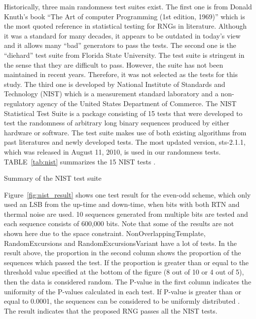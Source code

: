 Historically, three main randomness test suites exist. The first one is from Donald Knuth’s book “The Art of computer Programming (1st edition, 1969)” \cite{knuth1973art} which is the most quoted reference in statistical testing for RNGs in literature. Although it was a standard for many decades, it appears to be outdated in today’s view and it allows many “bad” generators to pass the tests. The second one is the “diehard” test suite from Florida State University. The test suite is stringent in the sense that they are difficult to pass. However, the suite has not been maintained in recent years. Therefore, it was not selected as the tests for this study. The third one is developed by National Institute of Standards and Technology (NIST) which is a measurement standard laboratory and a non-regulatory agency of the United States Department of Commerce. The NIST Statistical Test Suite is a package consisting of 15 tests that were developed to test the randomness of arbitrary long binary sequences produced by either hardware or software. The test suite makes use of both existing algorithms from past literatures and newly developed tests. The most updated version, sts-2.1.1, which was released in August 11, 2010, is used in our randomness tests. TABLE~\ref{tab:nist} summarizes the 15 NIST tests \cite{rukhin2001statistical}.

\begin{table}
  \begin{center}
    
  \end{center}
\caption{Summary of the NIST test suite}
\vspace{-0.2in}
\label{tab:nist}
\end{table}

Figure~\ref{fig:nist_result} shows one test result for the even-odd scheme, which only used an LSB from the up-time and down-time, when bits with both RTN and thermal noise are used. 10 sequences generated from multiple bits are tested and each sequence consists of 600,000 bits. Note that some of the results are not shown here due to the space constraint.  NonOverlappingTemplate, RandomExcursions and RandomExcursionsVariant have a lot of tests. In the result above, the proportion in the second column shows the proportion of the sequences which passed the test. If the proportion is greater than or equal to the threshold value specified at the bottom of the figure (8 out of 10 or 4 out of 5), then the data is considered random. The P-value in the first column indicates the uniformity of the P-values calculated in each test. If P-value is greater than or equal to 0.0001, the sequences can be considered to be uniformly distributed \cite{rukhin2001statistical}. The result indicates that the proposed RNG passes all the NIST tests. 

